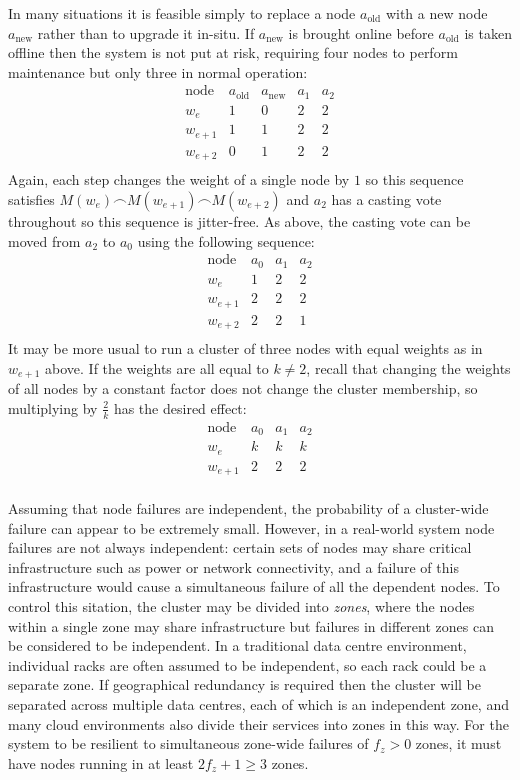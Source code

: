 \documentclass[journal]{IEEEtran}
\begin{document}
In many situations it is feasible simply to replace a node $a_{\textrm{old}}$
with a new node $a_{\textrm{new}}$ rather than to upgrade it in-situ. If
$a_{\textrm{new}}$ is brought online before $a_{\textrm{old}}$ is taken offline
then the system is not put at risk, requiring four nodes to perform maintenance
but only three in normal operation:
\[\begin{array}{rcccc}
\textrm{node}&a_{\textrm{old}}&a_{\textrm{new}}&a_1&a_2 \\
w_e&1&0&2&2\\
w_{e+1}&1&1&2&2\\
w_{e+2}&0&1&2&2\\
\end{array}\]
Again, each step changes the weight of a single node by $1$ so this sequence
satisfies $M(w_e) \frown M(w_{e+1}) \frown M(w_{e+2})$ and $a_2$ has a casting
vote throughout so this sequence is jitter-free. As above, the casting vote can
be moved from $a_2$ to $a_0$ using the following sequence:
\[\begin{array}{rcccc}
\textrm{node}&a_0&a_1&a_2 \\
w_e&1&2&2\\
w_{e+1}&2&2&2\\
w_{e+2}&2&2&1\\
\end{array}\]
It may be more usual to run a cluster of three nodes with equal weights as in
$w_{e+1}$ above. If the weights are all equal to $k \ne 2$, recall that
changing the weights of all nodes by a constant factor does not change the
cluster membership, so multiplying by $\frac{2}{k}$ has the desired effect:
\[\begin{array}{rcccc}
\textrm{node}&a_0&a_1&a_2 \\
w_e&k&k&k\\
w_{e+1}&2&2&2\\
\end{array}\]

Assuming that node failures are independent, the probability of a cluster-wide
failure can appear to be extremely small. However, in a real-world system node
failures are not always independent: certain sets of nodes may share critical
infrastructure such as power or network connectivity, and a failure of this
infrastructure would cause a simultaneous failure of all the dependent nodes.
To control this sitation, the cluster may be divided into \textit{zones}, where
the nodes within a single zone may share infrastructure but failures in
different zones can be considered to be independent. In a traditional data
centre environment, individual racks are often assumed to be independent, so
each rack could be a separate zone. If geographical redundancy is required then
the cluster will be separated across multiple data centres, each of which is an
independent zone, and many cloud environments also divide their services into
zones in this way.  For the system to be resilient to simultaneous zone-wide
failures of $f_z > 0$ zones, it must have nodes running in at least $2f_z + 1
\ge 3$ zones.
\end{document}
